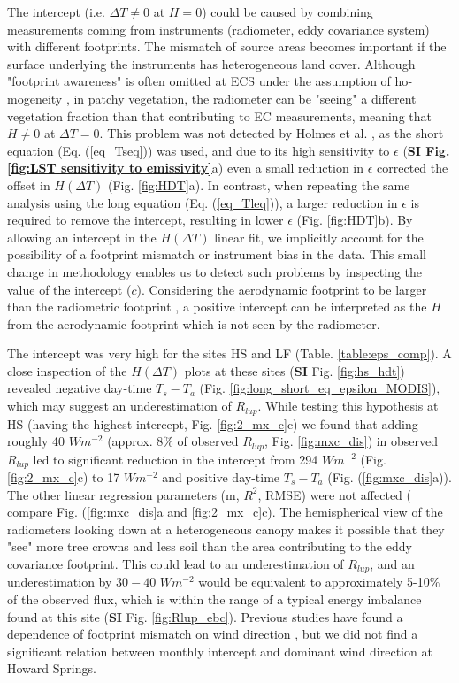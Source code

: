 \documentclass[fleqn,10pt]{wlscirep}
\begin{document}
{{The intercept (i.e. $\Delta T \ne 0$ at $H=0$) could be caused by combining measurements coming from instruments (radiometer, eddy covariance system) with different footprints\cite{marcolla2018geometry}. The mismatch of source areas becomes important if the surface underlying the instruments has heterogeneous land cover. 
 Although "footprint awareness" is often omitted at ECS under the assumption of ho­mogeneity \cite{chu2021representativeness}, in patchy vegetation, the radiometer can be "seeing" a different vegetation fraction than that contributing to EC measurements, meaning that $H\not= 0$ at $\Delta T=0$. This problem was not detected by Holmes et al. \cite{holmes2009land}, as the short equation (Eq. (\ref{eq_Tseq})) was used, and due to its high sensitivity to $\epsilon$ (\textbf{SI Fig. \ref{fig:LST sensitivity to emissivity}}a) even a small reduction in $\epsilon$ corrected the offset in $H(\Delta T)$ (Fig. \ref{fig:HDT}a). In contrast, when repeating the same analysis using the long equation (Eq. (\ref{eq_Tleq})), a larger reduction in $\epsilon$ is required to remove the intercept, resulting in lower $\epsilon$ (Fig. \ref{fig:HDT}b). By allowing an intercept in the $H(\Delta T)$ linear fit, we implicitly account for the possibility of a footprint mismatch or instrument bias in the data. This small change in methodology enables us to detect such problems by inspecting the value of the intercept ($c$). Considering  the aerodynamic footprint to be larger than the radiometric footprint \cite{marcolla2018geometry,chu2021representativeness}, a positive intercept can be interpreted as the $H$ from the aerodynamic footprint which is not seen by the radiometer.

 The intercept was very high for the sites HS and LF (Table. \ref{table:eps_comp}). A close inspection of the $H(\Delta T)$ plots at these sites (\textbf{SI} Fig. \ref{fig:hs_hdt}) revealed negative day-time $T_{s} -T_{a}$ (Fig. \ref{fig:long_short_eq_epsilon_MODIS}), which may suggest an underestimation of $R_{lup}$. While testing this hypothesis at HS (having the highest intercept, Fig. \ref{fig:2_mx_c}c) we found that  adding roughly 40 $Wm^{-2}$ (approx. 8\% of observed $R_{lup}$, Fig. \ref{fig:mxc_dis}) in observed $R_{lup}$ led to significant reduction in the intercept from 294 $Wm^{-2}$ (Fig. \ref{fig:2_mx_c}c) to 17 $Wm^{-2}$ and positive day-time $T_{s} - T_{a}$ (Fig. (\ref{fig:mxc_dis}a)). The other linear regression parameters (m, $R^{2}$, RMSE) were not affected ( compare Fig. (\ref{fig:mxc_dis}a and \ref{fig:2_mx_c}c). The hemispherical view of the radiometers looking down at a heterogeneous canopy makes it possible that they "see" more tree crowns and less soil than the area contributing to the eddy covariance footprint. This could lead to an underestimation of $R_{lup}$, and an underestimation by $30-40$ $Wm^{-2}$ would be equivalent to approximately 5-10$\%$ of the observed flux, which is within the range of a typical energy imbalance found at this site (\textbf{SI} Fig. \ref{fig:Rlup_ebc}). Previous studies have found a dependence of footprint mismatch on wind direction \cite{chu2021representativeness,marcolla2018geometry,morillas2013using}, but we did not find a significant relation between monthly intercept and dominant wind direction at Howard Springs.
 
}}
\end{document}
